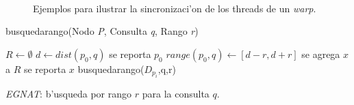 \documentclass[headings=optiontohead,12pt,letterpaper,oneside,spanish]{book}
\begin{document}
\begin{figure}
\begin{center}
~~~~~~~~~~~~
\caption{\label{cod_gpu_sync}Ejemplos para ilustrar la sincronizaci'on
de los threads de un \emph{warp}.}
\end{center}
\end{figure}



\begin{algorithm}
busquedarango(Nodo \emph{P}, Consulta \emph{q}, Rango \emph{r})
\footnotesize{
\begin{algorithmic}[1]
\STATE {}
\STATE $R \leftarrow \emptyset$
\STATE $d \leftarrow dist(p_0,q)$
\STATE se reporta $p_0$
\ENDIF
\STATE $range(p_0,q)\leftarrow [d-r,d+r]$
\STATE se agrega $x$ a $R$
\STATE se reporta $x$
\ENDIF
\ENDIF
\ENDFOR
{}
\STATE busquedarango($D_{p_i}$,q,r)
\ENDFOR

\end{algorithmic}
}
\caption{\emph{\label{cap:ALGgnat:-b=FAsqueda-por-rango}EGNAT}: b'usqueda por
rango $r$ para la consulta $q$.}
\end{algorithm}
\end{document}
